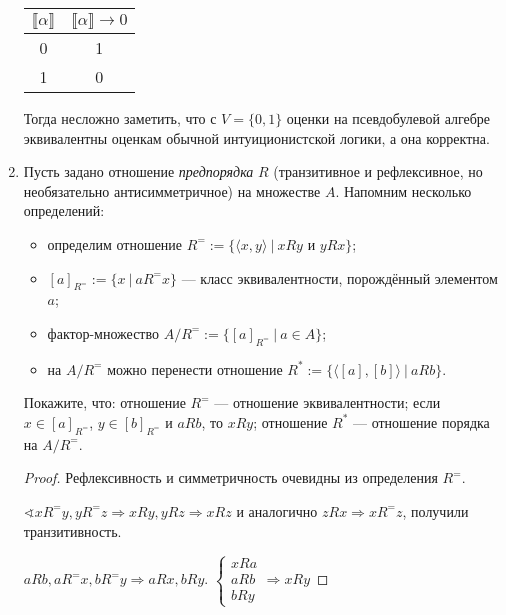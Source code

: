 \begin{enumerate}
          \begin{tabular}{c|c}
              \(\llbracket\alpha\rrbracket\) & \(\llbracket\alpha\rrbracket \to 0\) \\ \hline
              0                              & 1                                    \\
              1                              & 0                                    \\
          \end{tabular}

          Тогда несложно заметить, что с \(V = \{0, 1\}\) оценки на псевдобулевой алгебре эквивалентны оценкам обычной интуиционистской логики, а она корректна.

    \item Пусть задано отношение \emph{предпорядка} $R$ (транзитивное и рефлексивное, но необязательно антисимметричное) на множестве $A$.
          Напомним несколько определений:
          \begin{itemize}
              \item определим отношение $R^= := \{ \langle x,y \rangle\ |\ xRy \text{ и } yRx \}$;
              \item $[a]_{R^=} := \{ x\ |\ aR^=x \}$ --- класс эквивалентности, порождённый элементом $a$;
              \item фактор-множество $A/{R^=} := \{ [a]_{R^=}\ |\ a \in A \}$;
              \item на $A/{R^=}$ можно перенести отношение $R^* := \{ \langle [a],[b] \rangle\ |\ aRb \}$.
          \end{itemize}

          Покажите, что: отношение $R^=$ --- отношение эквивалентности; если $x \in [a]_{R^=}$, $y \in [b]_{R^=}$ и $aRb$, то $xRy$; отношение $R^*$ ---
          отношение порядка на $A/{R^=}$.

          \begin{proof}
              Рефлексивность и симметричность очевидны из определения \(R^ =\).

              \(\sphericalangle xR^{ = }y, yR^{ = }z \Rightarrow xRy, yRz \Rightarrow xRz\) и аналогично \(zRx \Rightarrow xR^{ = }z\), получили транзитивность.

              \(aRb, aR^{ = }x, bR^{ = }y \Rightarrow aRx, bRy\). \(\begin{cases} xRa \\ aRb \\ bRy \end{cases} \Rightarrow xRy\)


\end{proof}
\end{enumerate}
